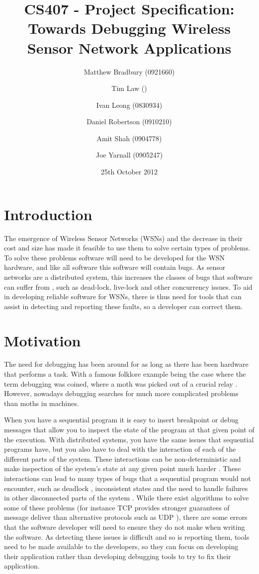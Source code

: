 \documentclass[a4paper]{article}
\title{CS407 - Project Specification:\\
Towards Debugging Wireless Sensor Network Applications}
\date{25th October 2012}
\author{
	Matthew Bradbury (0921660) \and
	Tim Law () \and
	Ivan Leong (0830934) \and
	Daniel Robertson (0910210) \and
	Amit Shah (0904778) \and
	Joe Yarnall (0905247)
}
\begin{document}
\maketitle

\pagestyle{empty}
\thispagestyle{empty}

\newpage

\pagestyle{plain}
\setcounter{page}{1}

\tableofcontents
\clearpage


\section{Introduction}

The emergence of Wireless Sensor Networks (WSNs) and the decrease in their cost and size has made it feasible to use them to solve certain types of problems. To solve these problems software will need to be developed for the WSN hardware, and like all software this software will contain bugs. As sensor networks are a distributed system, this increases the classes of bugs that software can suffer from \cite{?}, such as dead-lock, live-lock and other concurrency issues. To aid in developing reliable software for WSNs, there is thus need for tools that can assist in detecting and reporting these faults, so a developer can correct them.

\section{Motivation}

The need for debugging has been around for as long as there has been hardware that performs a task. With a famous folklore example being the case where the term debugging was coined, where a moth was picked out of a crucial relay \cite{shapiro1987etymology}. However, nowadays debugging searches for much more complicated problems than moths in machines.

When you have a sequential program it is easy to insert breakpoint or debug messages that allow you to inspect the state of the program at that given point of the execution. With distributed systems, you have the same issues that sequential programs have, but you also have to deal with the interaction of each of the different parts of the system. These interactions can be non-deterministic \cite{liu2007wids} and make inspection of the system's state at any given point much harder \cite{?}. These interactions can lead to many types of bugs that a sequential program would not encounter, such as deadlock \cite{singhal1989deadlock}, inconsistent states \cite{?} and the need to handle failures in other disconnected parts of the system \cite{?}. While there exist algorithms to solve some of these problems (for instance TCP provides stronger guarantees of message deliver than alternative protocols such as UDP \cite[p.~532]{Tanenbaum:2002:CN:572404}), there are some errors that the software developer will need to ensure they do not make when writing the software. As detecting these issues is difficult and so is reporting them, tools need to be made available to the developers, so they can focus on developing their application rather than developing debugging tools to try to fix their application.
\end{document}
